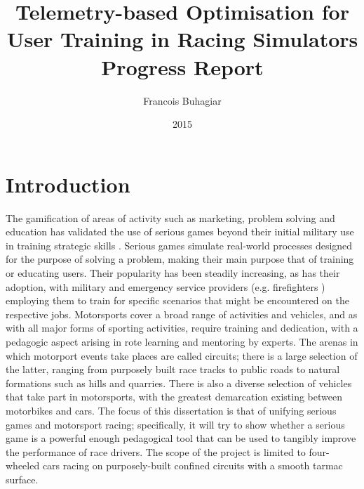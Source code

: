 \documentclass{article}
\title{Telemetry-based Optimisation for User Training in Racing Simulators \\ Progress Report}
\author{Francois Buhagiar}
\date{2015}
\begin{document}

\maketitle
\newpage
\tableofcontents

\setcounter{page}{1}

\newpage
\begin{abstract}
\end{abstract}

\newpage
\section{Introduction}
The gamification of areas of activity such as marketing, problem solving and education \cite{michael2005serious} has validated the use of serious games beyond their initial military use in training strategic skills \cite{djaouti2011classifying}.  Serious games simulate real-world processes designed for the purpose of solving a problem, making their main purpose that of training or educating users. Their popularity has been steadily increasing, as has their adoption, with military \cite{djaouti2011classifying} and emergency service providers (e.g. firefighters \cite{michael2005serious}) employing them to train for specific scenarios that might be encountered on the respective jobs. Motorsports cover a broad range of activities and vehicles, and as with all major forms of sporting activities, require training and dedication, with a pedagogic aspect arising in rote learning and mentoring by experts. The arenas in which motorport events take places are called circuits; there is a large selection of the latter, ranging from purposely built race tracks to public roads to natural formations such as hills and quarries. There is also a diverse selection of vehicles that take part in motorsports, with the greatest demarcation existing between motorbikes and cars. The focus of this dissertation is that of unifying serious games and motorsport racing; specifically, it will try to show whether a serious game is a powerful enough pedagogical tool that can be used to tangibly improve the performance of race drivers. The scope of the project is limited to four-wheeled cars racing on purposely-built confined circuits with a smooth tarmac surface.  
\end{document}
